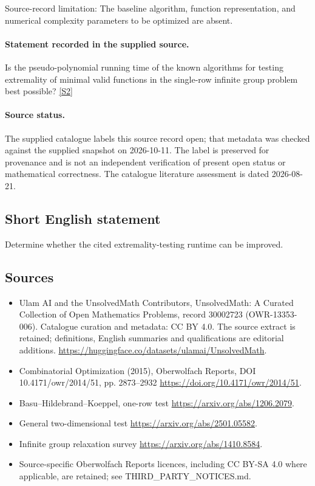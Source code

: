 \documentclass[11pt]{article}
\begin{document}
Source-record limitation: The baseline algorithm, function representation, and numerical complexity parameters to be optimized are absent.
\paragraph{Statement recorded in the supplied source.}
Is the pseudo-polynomial running time of the known algorithms for testing extremality of minimal valid functions in the single-row infinite group problem best possible? \href{https://doi.org/10.4171/owr/2014/51}{[S2]}
\paragraph{Source status.}
The supplied catalogue labels this source record open; that metadata was checked against the supplied snapshot on 2026-10-11. The label is preserved for provenance and is not an independent verification of present open status or mathematical correctness. The catalogue literature assessment is dated 2026-08-21.
\subsection{Short English statement}
Determine whether the cited extremality-testing runtime can be improved.
\subsection{Sources}
\begin{itemize}
\item[S1] Ulam AI and the UnsolvedMath Contributors, UnsolvedMath: A Curated Collection of Open Mathematics Problems, record 30002723 (OWR-13353-006). Catalogue curation and metadata: CC BY 4.0. The source extract is retained; definitions, English summaries and qualifications are editorial additions.
\url{https://huggingface.co/datasets/ulamai/UnsolvedMath}.
\item[S2] Combinatorial Optimization (2015), Oberwolfach Reports, DOI 10.4171/owr/2014/51, pp. 2873--2932
\url{https://doi.org/10.4171/owr/2014/51}.
\item[S3] Basu--Hildebrand--Koeppel, one-row test
\url{https://arxiv.org/abs/1206.2079}.
\item[S4] General two-dimensional test
\url{https://arxiv.org/abs/2501.05582}.
\item[S5] Infinite group relaxation survey
\url{https://arxiv.org/abs/1410.8584}.
\item Source-specific Oberwolfach Reports licences, including CC BY-SA 4.0 where applicable, are retained; see THIRD\_PARTY\_NOTICES.md.
\end{itemize}
\end{document}
